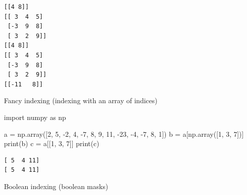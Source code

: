 \documentclass[
  english,
  letterpaper,
  DIV=11,
  numbers=noendperiod]{scrreprt}
\newenvironment{Shaded}{\begin{snugshade}}{\end{snugshade}}
\newcommand{\BuiltInTok}[1]{\textcolor[rgb]{0.00,0.23,0.31}{#1}}
\newcommand{\DecValTok}[1]{\textcolor[rgb]{0.68,0.00,0.00}{#1}}
\newcommand{\ImportTok}[1]{\textcolor[rgb]{0.00,0.46,0.62}{#1}}
\newcommand{\NormalTok}[1]{\textcolor[rgb]{0.00,0.23,0.31}{#1}}
\newcommand{\OperatorTok}[1]{\textcolor[rgb]{0.37,0.37,0.37}{#1}}
\begin{document}
\begin{verbatim}
[[4 8]]
[[ 3  4  5]
 [-3  9  8]
 [ 3  2  9]]
[[4 8]]
[[ 3  4  5]
 [-3  9  8]
 [ 3  2  9]]
[[-11   8]]
\end{verbatim}

Fancy indexing (indexing with an array of indices)

\begin{Shaded}
\begin{Highlighting}[]
\ImportTok{import}\NormalTok{ numpy }\ImportTok{as}\NormalTok{ np}

\NormalTok{a }\OperatorTok{=}\NormalTok{ np.array([}\DecValTok{2}\NormalTok{, }\DecValTok{5}\NormalTok{, }\OperatorTok{{-}}\DecValTok{2}\NormalTok{, }\DecValTok{4}\NormalTok{, }\OperatorTok{{-}}\DecValTok{7}\NormalTok{, }\DecValTok{8}\NormalTok{, }\DecValTok{9}\NormalTok{, }\DecValTok{11}\NormalTok{, }\OperatorTok{{-}}\DecValTok{23}\NormalTok{, }\OperatorTok{{-}}\DecValTok{4}\NormalTok{, }\OperatorTok{{-}}\DecValTok{7}\NormalTok{, }\DecValTok{8}\NormalTok{, }\DecValTok{1}\NormalTok{])}
\NormalTok{b }\OperatorTok{=}\NormalTok{ a[np.array([}\DecValTok{1}\NormalTok{, }\DecValTok{3}\NormalTok{, }\DecValTok{7}\NormalTok{])]}
\BuiltInTok{print}\NormalTok{(b)}
\NormalTok{c }\OperatorTok{=}\NormalTok{ a[[}\DecValTok{1}\NormalTok{, }\DecValTok{3}\NormalTok{, }\DecValTok{7}\NormalTok{]]}
\BuiltInTok{print}\NormalTok{(c)}
\end{Highlighting}
\end{Shaded}

\begin{verbatim}
[ 5  4 11]
[ 5  4 11]
\end{verbatim}

Boolean indexing (boolean masks)
\end{document}
